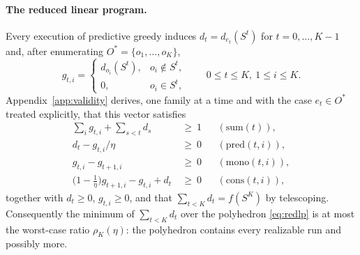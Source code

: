 \paragraph{The reduced linear program.}
Every execution of predictive greedy induces $d_t=d_{e_t}(S^{t})$ for
$t=0,\dots,K-1$ and, after enumerating $O^{\ast}=\{o_1,\dots,o_K\}$,
\[
  g_{t,i}=\begin{cases} d_{o_i}(S^{t}), & o_i\notin S^{t},\\ 0,& o_i\in S^{t},
  \end{cases}\qquad 0\le t\le K,\ 1\le i\le K .
\]
Appendix~\ref{app:validity} derives, one family at a time and with the case
$e_t\in O^{\ast}$ treated explicitly, that this vector satisfies
\begin{equation}\label{eq:redlp}
\begin{aligned}
  \textstyle\sum_{i}g_{t,i}+\sum_{s<t}d_s&\ \ge\ 1 && (\mathrm{sum}(t)),\\
  d_t-g_{t,i}/\eta&\ \ge\ 0 && (\mathrm{pred}(t,i)),\\
  g_{t,i}-g_{t+1,i}&\ \ge\ 0 && (\mathrm{mono}(t,i)),\\
  \bigl(1-\tfrac1\eta\bigr)g_{t+1,i}-g_{t,i}+d_t&\ \ge\ 0
      && (\mathrm{cons}(t,i)),
\end{aligned}
\end{equation}
together with $d_t\ge0$, $g_{t,i}\ge0$, and that $\sum_{t<K}d_t=f(S^{K})$ by
telescoping.  Consequently the minimum of $\sum_{t<K}d_t$ over the polyhedron
\eqref{eq:redlp} is at most the worst-case ratio $\rho_K(\eta)$: the
polyhedron contains every realizable run and possibly more.

